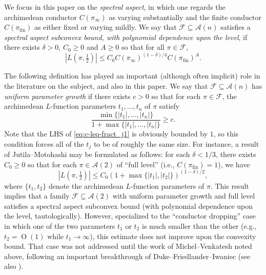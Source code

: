 \documentclass[reqno]{amsart}
\def\O{\operatorname{O}}
\DeclareMathOperator{\fin}{fin}
\theoremstyle{plain} \newtheorem{theorem} {Theorem}
\theoremstyle{definition} \newtheorem{definition} [theorem] {Definition}
\theoremstyle{itplain} %
\numberwithin{equation}{section}
\numberwithin{theorem}{section}
\renewcommand{\geq}{\geqslant}
\renewcommand{\leq}{\leqslant}
\begin{document}
We focus in this paper on the \emph{spectral aspect}, in which one regards the archimedean conductor $C(\pi_\infty)$ as varying substantially and the finite conductor $C(\pi_{\fin})$ as either fixed or varying mildly.  We say that $\mathcal{F} \subseteq  \mathcal{A}(n)$ satisfies a \emph{spectral aspect subconvex bound, with polynomial dependence upon the level}, if there exists $\delta > 0$, $C_0 \geq 0$ and $A \geq 0$ so that for all $\pi \in \mathcal{F}$,
\begin{equation}\label{eq:lpi-tfrac12-leq-1}
  |L(\pi,\tfrac{1}{2})| \leq C_0 C(\pi_\infty)^{(1-\delta)/4} C(\pi_{\fin})^{A}.
\end{equation}

The following definition has played an important (although often implicit) role in the literature on the subject, and also in this paper.  We say that $\mathcal{F} \subseteq \mathcal{A}(n)$ has \emph{uniform parameter growth} if there exists $c > 0$ so that for each $\pi \in \mathcal{F}$, the archimedean $L$-function parameters $t_1,\dotsc,t_n$ of $\pi$ satisfy
\begin{equation}\label{eq:c-leq-fract_j1}
  \frac{\min \{|t_1|, \dotsc, |t_n|\} }{1 + \max \{|t_1|,\dotsc,|t_n|\}} \geq c.
\end{equation}
Note that the LHS of \eqref{eq:c-leq-fract_j1} is obviously bounded by $1$, so this condition forces all of the $t_j$ to be of roughly the same size.  For instance, a result of Jutila--Motohashi \cite{MR2233686} may be formulated as follows: for each $\delta < 1/3$, there exists $C_0 \geq 0$ so that for each $\pi \in \mathcal{A}(2)$ of ``full level'' (i.e., $C(\pi_{\fin}) = 1$), we have
\begin{equation*}
  |L(\pi,\tfrac{1}{2})| \leq C_0 (1 + \max \{|t_1|, |t_2|\})^{(1 - \delta)/2},
\end{equation*}
where $\{t_1, t_2\}$ denote the archimedean $L$-function parameters of $\pi$.  This result implies that a family $\mathcal{F} \subseteq \mathcal{A}(2)$ with uniform parameter growth and full level satisfies a spectral aspect subconvex bound (with polynomial dependence upon the level, tautologically).  However, specialized to the ``conductor dropping'' case in which one of the two parameters $t_1$ or $t_2$ is much smaller than the other (e.g., $t_2 = \O(1)$ while $t_1 \rightarrow \infty$), this estimate does not improve upon the convexity bound.  That case was not addressed until the work of Michel--Venkatesh noted above, following an important breakthrough of Duke--Friedlander--Iwaniec \cite{MR1923476} (see also \cite{MR2382859, Mi04, MR3912807}).
\end{document}
